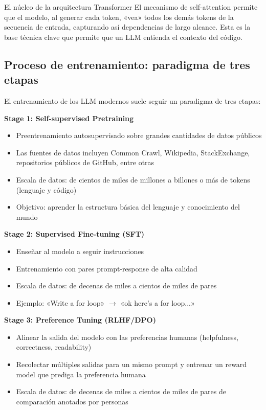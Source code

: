 \documentclass[a4paper]{article}
\begin{document}
\begin{knowledgebox}{El núcleo de la arquitectura Transformer}
El mecanismo de self-attention permite que el modelo, al generar cada token, «vea» todos los demás tokens de la secuencia de entrada, capturando así dependencias de largo alcance. Esta es la base técnica clave que permite que un LLM entienda el contexto del código.
\end{knowledgebox}

\subsection{Proceso de entrenamiento: paradigma de tres etapas}

El entrenamiento de los LLM modernos suele seguir un paradigma de tres etapas:

\textbf{Stage 1: Self-supervised Pretraining}
\begin{itemize}
    \item Preentrenamiento autosupervisado sobre grandes cantidades de datos públicos
    \item Las fuentes de datos incluyen Common Crawl, Wikipedia, StackExchange, repositorios públicos de GitHub, entre otras
    \item Escala de datos: de cientos de miles de millones a billones o más de tokens (lenguaje y código)
    \item Objetivo: aprender la estructura básica del lenguaje y conocimiento del mundo
\end{itemize}

\textbf{Stage 2: Supervised Fine-tuning (SFT)}
\begin{itemize}
    \item Enseñar al modelo a seguir instrucciones
    \item Entrenamiento con pares prompt-response de alta calidad
    \item Escala de datos: de decenas de miles a cientos de miles de pares
    \item Ejemplo: «Write a for loop» $\rightarrow$ «ok here's a for loop...»
\end{itemize}

\textbf{Stage 3: Preference Tuning (RLHF/DPO)}
\begin{itemize}
    \item Alinear la salida del modelo con las preferencias humanas (helpfulness, correctness, readability)
    \item Recolectar múltiples salidas para un mismo prompt y entrenar un reward model que prediga la preferencia humana
    \item Escala de datos: de decenas de miles a cientos de miles de pares de comparación anotados por personas
\end{itemize}
\end{document}
